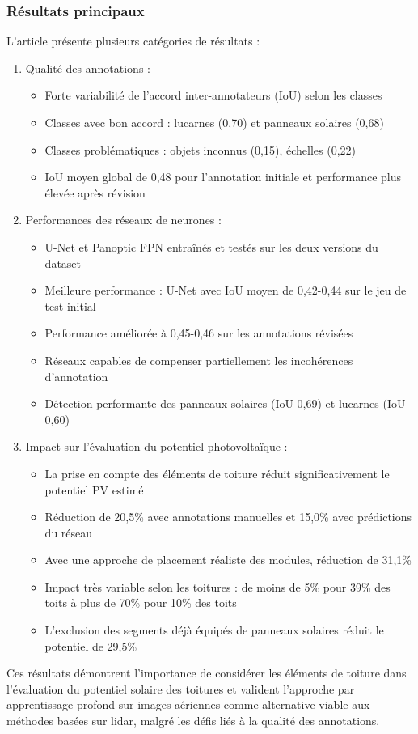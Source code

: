 {{{{\subsubsection{Résultats principaux}
L'article présente plusieurs catégories de résultats :
\begin{enumerate}
    \item Qualité des annotations :
    \begin{itemize}
        \item Forte variabilité de l'accord inter-annotateurs (IoU) selon les classes
        \item Classes avec bon accord : lucarnes (0,70) et panneaux solaires (0,68)
        \item Classes problématiques : objets inconnus (0,15), échelles (0,22)
        \item IoU moyen global de 0,48 pour l'annotation initiale et performance plus élevée après révision
    \end{itemize}
    \item Performances des réseaux de neurones :
    \begin{itemize}
        \item U-Net et Panoptic FPN entraînés et testés sur les deux versions du dataset
        \item Meilleure performance : U-Net avec IoU moyen de 0,42-0,44 sur le jeu de test initial
        \item Performance améliorée à 0,45-0,46 sur les annotations révisées
        \item Réseaux capables de compenser partiellement les incohérences d'annotation
        \item Détection performante des panneaux solaires (IoU 0,69) et lucarnes (IoU 0,60)
    \end{itemize}
    \item Impact sur l'évaluation du potentiel photovoltaïque :
    \begin{itemize}
        \item La prise en compte des éléments de toiture réduit significativement le potentiel PV estimé
        \item Réduction de 20,5\% avec annotations manuelles et 15,0\% avec prédictions du réseau
        \item Avec une approche de placement réaliste des modules, réduction de 31,1\%
        \item Impact très variable selon les toitures : de moins de 5\% pour 39\% des toits à plus de 70\% pour 10\% des toits
        \item L'exclusion des segments déjà équipés de panneaux solaires réduit le potentiel de 29,5\%
    \end{itemize}
\end{enumerate}
\par{Ces résultats démontrent l'importance de considérer les éléments de toiture dans l'évaluation du potentiel solaire des toitures et valident l'approche par apprentissage profond sur images aériennes comme alternative viable aux méthodes basées sur \gls{lidar}, malgré les défis liés à la qualité des annotations.}

}}}}
